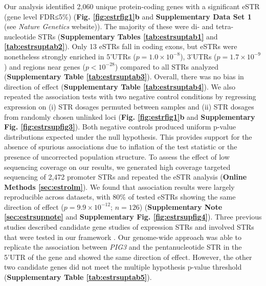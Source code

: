 Our analysis identified 2,060 unique protein-coding genes with a significant eSTR (gene level FDR≤5\%) (\textbf{Fig. \ref{fig:estrfig1}b} and \textbf{Supplementary Data Set 1} (see \emph{Nature Genetics} website)). The majority of these were di- and tetra-nucleotide STRs (\textbf{Supplementary Tables \ref{tab:estrsuptab1}} and \textbf{\ref{tab:estrsuptab2}}). Only 13 eSTRs fall in coding exons, but eSTRs were nonetheless strongly enriched in 5’UTRs ($p=1.0 \times 10^{-8}$), 3'UTRs ($p=1.7\times10^{-9}$) and regions near genes ($p<10^{-28}$) compared to all STRs analyzed (\textbf{Supplementary Table \ref{tab:estrsuptab3}}). Overall, there was no bias in direction of effect (\textbf{Supplementary Table \ref{tab:estrsuptab4}}). We also repeated the association tests with two negative control conditions by regressing expression on (i) STR dosages permuted between samples and (ii) STR dosages from randomly chosen unlinked loci (\textbf{Fig. \ref{fig:estrfig1}b} and \textbf{Supplementary Fig. \ref{fig:estrsupfig3}}). Both negative controls produced uniform p-value distributions expected under the null hypothesis. This provides support for the absence of spurious associations due to inflation of the test statistic or the presence of uncorrected population structure. To assess the effect of low sequencing coverage on our results, we generated high coverage targeted sequencing of 2,472 promoter STRs and repeated the eSTR analysis (\textbf{Online Methods \ref{sec:estrolm}}). We found that association results were largely reproducible across datasets, with 80\% of tested eSTRs showing the same direction of effect ($p=9.9\times 10^{-12}$; $n=126$) (\textbf{Supplementary Note \ref{sec:estrsupnote}} and \textbf{Supplementary Fig. \ref{fig:estrsupfig4}}). Three previous studies described candidate gene studies of expression STRs and involved STRs that were tested in our framework \cite{GebhardtZankerBrandt1999,ShimajiriArimaTanimotoEtAl1999,ContenteDittmerKochEtAl2002}. Our genome-wide approach was able to replicate the association between \emph{PIG3} and the pentanucleotide STR in the 5'UTR of the gene and showed the same direction of effect. However, the other two candidate genes did not meet the multiple hypothesis p-value threshold (\textbf{Supplementary Table \ref{tab:estrsuptab5}}).

